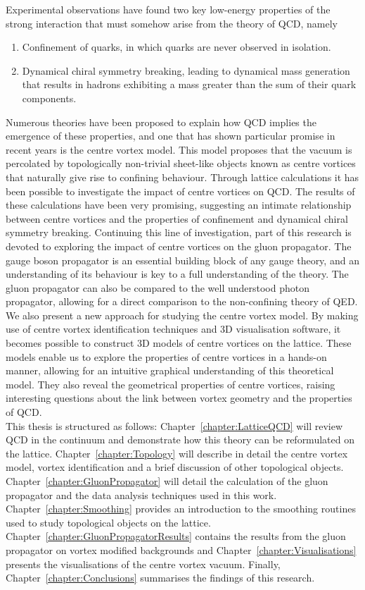 Experimental observations have found two key low-energy properties of the strong interaction that must somehow arise from the theory of QCD, namely
%
\begin{enumerate}
\item Confinement of quarks, in which quarks are never observed in isolation.
\item Dynamical chiral symmetry breaking, leading to dynamical mass generation that results in hadrons exhibiting a mass greater than the sum of their quark components.
\end{enumerate}
%
Numerous theories have been proposed to explain how QCD implies the emergence of these properties, and one that has shown particular promise in recent years is the centre vortex model. This model proposes that the vacuum is percolated by topologically non-trivial sheet-like objects known as centre vortices that naturally give rise to confining behaviour. Through lattice calculations it has been possible to investigate the impact of centre vortices on QCD. The results of these calculations have been very promising, suggesting an intimate relationship between centre vortices and the properties of confinement and dynamical chiral symmetry breaking. Continuing this line of investigation, part of this research is devoted to exploring the impact of centre vortices on the gluon propagator. The gauge boson propagator is an essential building block of any gauge theory, and an understanding of its behaviour is key to a full understanding of the theory. The gluon propagator can also be compared to the well understood photon propagator, allowing for a direct comparison to the non-confining theory of QED.\\

We also present a new approach for studying the centre vortex model. By making use of centre vortex identification techniques and 3D visualisation software, it becomes possible to construct 3D models of centre vortices on the lattice. These models enable us to explore the properties of centre vortices in a hands-on manner, allowing for an intuitive graphical understanding of this theoretical model. They also reveal the geometrical properties of centre vortices, raising interesting questions about the link between vortex geometry and the properties of QCD.\\

This thesis is structured as follows: Chapter~\ref{chapter:LatticeQCD} will review QCD in the continuum and demonstrate how this theory can be reformulated on the lattice. Chapter~\ref{chapter:Topology} will describe in detail the centre vortex model, vortex identification and a brief discussion of other topological objects. Chapter~\ref{chapter:GluonPropagator} will detail the calculation of the gluon propagator and the data analysis techniques used in this work. Chapter~\ref{chapter:Smoothing} provides an introduction to the smoothing routines used to study topological objects on the lattice. Chapter~\ref{chapter:GluonPropagatorResults} contains the results from the gluon propagator on vortex modified backgrounds and Chapter~\ref{chapter:Visualisations} presents the visualisations of the centre vortex vacuum. Finally, Chapter~\ref{chapter:Conclusions} summarises the findings of this research.